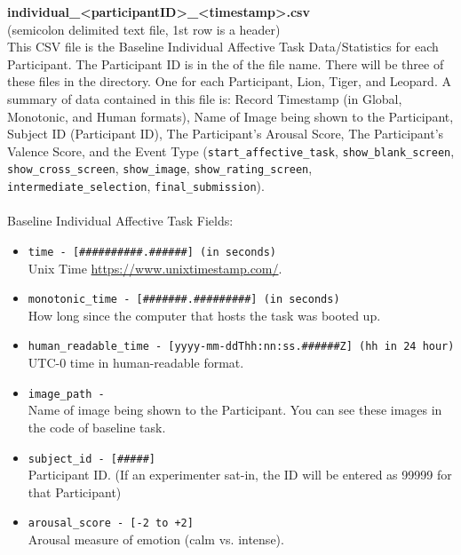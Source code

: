 \begin{description}
\begin{addmargin}[0em]{0em}
        \begin{addmargin}[1em]{0em} %
            \textbf{individual\_<participantID>\_<timestamp>.csv}\\(semicolon delimited text file, 1st row is a header)\\
            This CSV file is the Baseline Individual Affective Task Data/Statistics for
            each Participant. The Participant ID is in the of the file name. There will be
            three of these files in the directory. One for each Participant, Lion, Tiger,
            and Leopard. A summary of data contained in this file is: Record Timestamp (in
            Global, Monotonic, and Human formats), Name of Image being shown to the
            Participant, Subject ID (Participant ID), The Participant's Arousal Score, The
            Participant's Valence Score, and the Event Type (\verb|start_affective_task|,
            \verb|show_blank_screen|, \verb|show_cross_screen|, \verb|show_image|,
            \verb|show_rating_screen|, \verb|intermediate_selection|,
            \verb|final_submission|).\\\\
            Baseline Individual Affective Task Fields:
            \begin{itemize}
                \item \verb|time - [##########.######] (in seconds)|\\Unix Time \href{https://www.unixtimestamp.com/}{https://www.unixtimestamp.com/}.
                \item \verb|monotonic_time - [#######.#########] (in seconds)|\\How long since the computer that hosts the task was booted up.
                \item \verb|human_readable_time - [yyyy-mm-ddThh:nn:ss.######Z] (hh in 24 hour)|\\ UTC-0 time in human-readable format.
                \item \verb|image_path -|\\Name of image being shown to the Participant. You can see these images in the code of baseline task.
                \item \verb|subject_id - [#####]|\\Participant ID. (If an experimenter sat-in, the ID will be entered as 99999 for that Participant)
                \item \verb|arousal_score - [-2 to +2]|\\Arousal measure of emotion (calm vs. intense).

\end{itemize}
\end{addmargin}
\end{addmargin}
\end{description}
